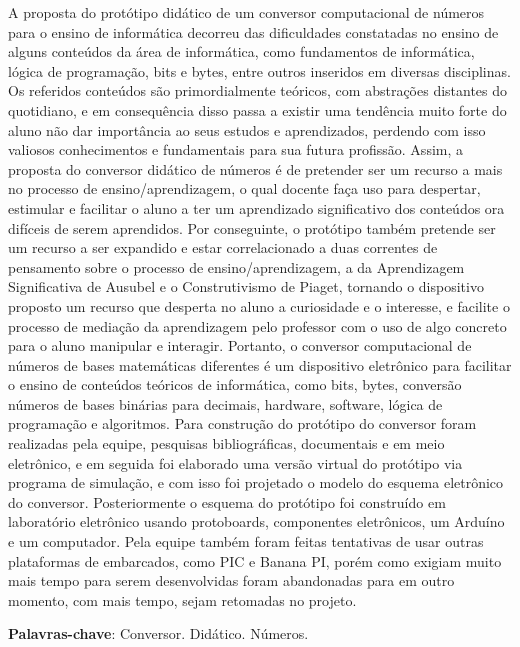 \documentclass[article,12pt,onesidea,4paper,english,brazil]{abntex2}
\begin{document}
	\noindent A proposta do protótipo didático de um conversor computacional de números para o
	ensino de informática decorreu das dificuldades constatadas no ensino de alguns
	conteúdos da área de informática, como fundamentos de informática, lógica de
	programação, bits e bytes, entre outros inseridos em diversas disciplinas. Os
	referidos conteúdos são primordialmente teóricos, com abstrações distantes do
	quotidiano, e em consequência disso passa a existir uma tendência muito forte do
	aluno não dar importância ao seus estudos e aprendizados, perdendo com isso
	valiosos conhecimentos e fundamentais para sua futura profissão. Assim, a proposta
	do conversor didático de números é de pretender ser um recurso a mais no processo
	de ensino/aprendizagem, o qual docente faça uso para despertar, estimular e
	facilitar o aluno a ter um aprendizado significativo dos conteúdos ora difíceis de
	serem aprendidos. Por conseguinte, o protótipo também pretende ser um recurso a
	ser expandido e estar correlacionado a duas correntes de pensamento sobre o
	processo de ensino/aprendizagem, a da Aprendizagem Significativa de Ausubel e o
	Construtivismo de Piaget, tornando o dispositivo proposto um recurso que desperta
	no aluno a curiosidade e o interesse, e facilite o processo de mediação da
	aprendizagem pelo professor com o uso de algo concreto para o aluno manipular e
	interagir. Portanto, o conversor computacional de números de bases matemáticas
	diferentes é um dispositivo eletrônico para facilitar o ensino de conteúdos teóricos de
	informática, como bits, bytes, conversão números de bases binárias para decimais, hardware, software, lógica de programação e algoritmos. Para construção do
	protótipo do conversor foram realizadas pela equipe, pesquisas bibliográficas, documentais e em meio eletrônico, e em seguida foi elaborado uma versão virtual do
	protótipo via programa de simulação, e com isso foi projetado o modelo do esquema
	eletrônico do conversor. Posteriormente o esquema do protótipo foi construído em
	laboratório eletrônico usando protoboards, componentes eletrônicos, um Arduíno e
	um computador. Pela equipe também foram feitas tentativas de usar outras
	plataformas de embarcados, como PIC e Banana PI, porém como exigiam muito mais tempo para serem desenvolvidas foram abandonadas para em outro momento, com mais tempo, sejam retomadas no projeto.
	
	\vspace{\onelineskip}
	
	\noindent
	\textbf{Palavras-chave}: Conversor. Didático. Números.
	
\end{document}
